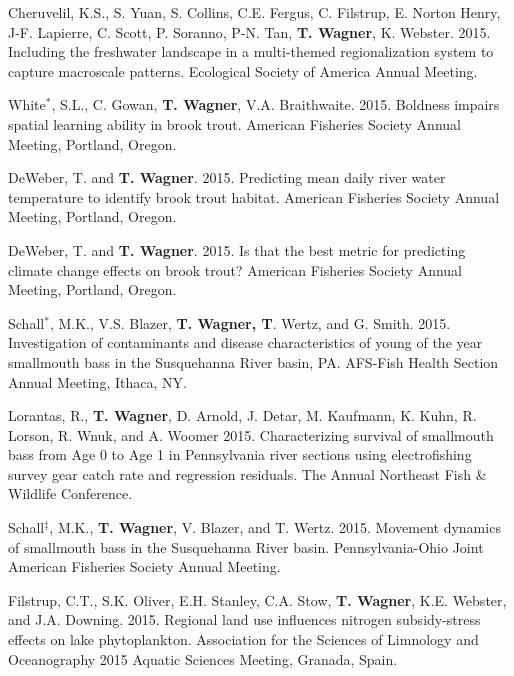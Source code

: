 \documentclass[10pt]{article}
\begin{document}
\begin{flushleft}
\begin{etaremune}
\item Cheruvelil, K.S., S. Yuan, S. Collins, C.E. Fergus, C. Filstrup, E. Norton Henry, J-F. Lapierre, C. Scott, P. Soranno, P-N. Tan, {\bf T. Wagner}, K. Webster. 2015. Including the freshwater landscape in a multi-themed regionalization system to capture macroscale patterns. Ecological Society of America Annual Meeting.

\item White$^*$, S.L., C. Gowan, {\bf T. Wagner}, V.A. Braithwaite. 2015. Boldness impairs spatial learning ability in brook trout. American Fisheries Society Annual Meeting, Portland, Oregon.

\item DeWeber, T. and {\bf T. Wagner}. 2015. Predicting mean daily river water temperature to identify brook trout habitat. American Fisheries Society Annual Meeting, Portland, Oregon.

\item DeWeber, T. and {\bf T. Wagner}. 2015. Is that the best metric for predicting climate change effects on brook trout? American Fisheries Society Annual Meeting, Portland, Oregon.

\item Schall$^*$, M.K., V.S. Blazer, {\bf T. Wagner, T}. Wertz, and G. Smith.  2015. Investigation of contaminants and disease characteristics of young of the year smallmouth bass in the Susquehanna River basin, PA. AFS-Fish Health Section Annual Meeting, Ithaca, NY. 

\item Lorantas, R., {\bf T. Wagner}, D. Arnold, J. Detar, M. Kaufmann, K. Kuhn, R. Lorson, R. Wnuk, and A. Woomer 2015. Characterizing survival of smallmouth bass from Age 0 to Age 1 in Pennsylvania river sections using electrofishing survey gear catch rate and regression residuals.  The Annual Northeast Fish \& Wildlife Conference. 

\item Schall$^\ddagger$, M.K.,  {\bf T. Wagner}, V. Blazer, and T. Wertz. 2015. Movement dynamics of smallmouth bass in the Susquehanna River basin. Pennsylvania-Ohio Joint American Fisheries Society Annual Meeting.

\item Filstrup, C.T., S.K. Oliver, E.H. Stanley, C.A. Stow, {\bf T. Wagner}, K.E. Webster, and J.A. Downing. 2015. Regional land use influences nitrogen subsidy-stress effects on lake phytoplankton. Association for the Sciences of Limnology and Oceanography 2015 Aquatic Sciences Meeting, Granada, Spain. 



\end{etaremune}
\end{flushleft}
\end{document}
